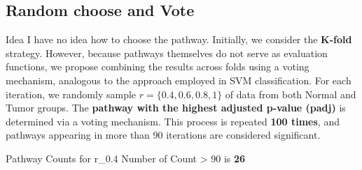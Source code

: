 \documentclass[12pt, aspectratio=43]{beamer}
\begin{document}
	\subsection{Random choose and Vote}
	
	\begin{frame}{Idea}
		I have no idea how to choose the pathway.
		\vskip 0.2cm
		Initially, we consider the \textbf{K-fold} strategy. However, because pathways themselves do not serve as evaluation functions, we propose combining the results across folds using a voting mechanism, analogous to the approach employed in SVM classification.
		\vskip 0.2cm
		For each iteration, we randomly sample $r = \{0.4, 0.6, 0.8, 1\}$ of data from both Normal and Tumor groups. The \textbf{pathway with the highest adjusted p-value (padj)} is determined via a voting mechanism. This process is repeated \textbf{100 times}, and pathways appearing in more than 90 iterations are considered significant.
		
	\end{frame}
	
	
	\begin{frame}{Pathway Counts for r\_0.4}
		\scriptsize  %
		Number of Count > 90 is \textbf{26}
	\end{frame}
	
\end{document}
